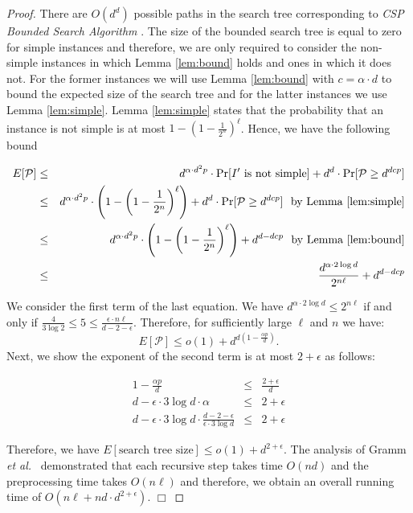 \begin{proof} There are $O(d^d)$ possible paths in the search tree corresponding to {\em CSP Bounded Search Algorithm} \cite{GNR03}. The size of the bounded search tree is equal to zero for simple instances and therefore, we are only required to consider the non-simple instances in which Lemma \ref{lem:bound} holds and ones in which it does not.  For the former instances we will use Lemma \ref{lem:bound} with $c = \alpha \cdot d$ to bound the expected size of the search tree and for the latter instances we use Lemma \ref{lem:simple}.  Lemma \ref{lem:simple} states that the probability that an instance is not simple is at most  $1 - \left( 1  - \frac{1}{2^n}\right)^{\ell}$.  Hence, we have the following bound

\begin{eqnarray*}
E[\mathcal{P}] & \leq & d^{\alpha \cdot d^2p} \cdot \Pr[I' \mbox{ is not simple}] + d^d \cdot\Pr[\mathcal{P} \geq d^{dcp}] \\
 								& \leq & d^{\alpha \cdot d^2p} \cdot \left( 1 - \left( 1  - \frac{1}{2^n}\right)^{\ell} \right) +d^d \cdot\Pr[\mathcal{P} \geq d^{dcp}]  \, \, \mbox{ by Lemma \ref{lem:simple}}\\
 											& \leq & d^{\alpha \cdot d^2p} \cdot \left( 1 - \left( 1  - \frac{1}{2^n}\right)^{\ell} \right) + d^{d - dcp}   \, \, \mbox{ by Lemma \ref{lem:bound}}\\
 											& \leq & \frac{d^{\alpha \cdot 2 \log d}} {2^{n\ell}} + d^{d - dcp} \\
\end{eqnarray*}  

We consider the first term of the last equation.  We have $d^{ \alpha \cdot 2 \log d} \leq 2^{n \ell}$ if and only if $\frac{4}{3 \log 2} \leq 5 \leq \frac{\epsilon \cdot n \ell}{d - 2 - \epsilon}$.  Therefore, for sufficiently large $\ell$ and $n$ we have: $$ E[\mathcal{P}] \leq  o(1) +  d^{d(1 -\frac{\alpha p}{d})}.$$ Next, we show the exponent of the second term is at most $2 + \epsilon$ as follows:

\begin{eqnarray*}
1 - \frac{\alpha p}{d}  & \leq & \frac{2 + \epsilon}{d} \\
d - \epsilon \cdot 3 \log d \cdot \alpha & \leq & 2 + \epsilon \\
d - \epsilon \cdot 3 \log d \cdot \frac{d - 2 - \epsilon}{\epsilon \cdot 3 \log d} & \leq & 2 + \epsilon 
\end{eqnarray*}  

Therefore, we have $E[\mbox{search tree size}] \leq o(1) +  d^{2 + \epsilon}$. The analysis of Gramm {\em et al.}\ \cite{GNR03} demonstrated that each recursive step takes time $O(nd)$ and the preprocessing time takes $O(n\ell)$ and therefore, we obtain an overall running time of $O(n \ell + n d \cdot d^{2 + \epsilon})$. \hfill $\Box$ \end{proof}

